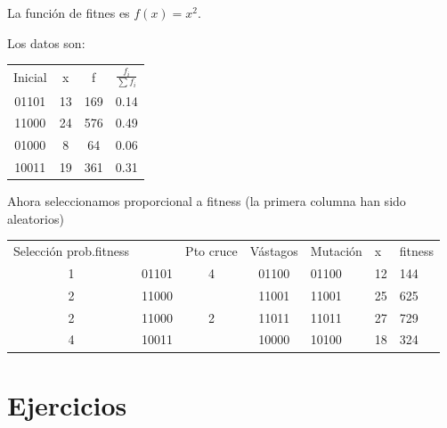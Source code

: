 \documentclass{apuntes}
\begin{document}
\begin{example}

La función de fitnes es $f(x) = x^2$.

Los datos son:

\begin{center}
\begin{tabular}{cccc}
Inicial & x & f & $\frac{f_i}{\sum f_i}$\\
01101&13&169&0.14\\
11000&24&576&0.49\\
01000&8&64&0.06\\
10011&19&361&0.31
\end{tabular}
\end{center}

Ahora seleccionamos proporcional a fitness (la primera columna han sido aleatorios)

\begin{center}
\begin{tabular}{cccc}
Selección prob.fitness && Pto cruce & Vástagos & Mutación & x & fitness\\
1 & 01101 & 4 & 01100 & 01100 & 12 & 144\\
2 & 11000 &   & 11001 & 11001 & 25 & 625\\
2 & 11000 & 2 & 11011 & 11011 & 27 & 729\\
4 & 10011 &   & 10000 & 10100 & 18 & 324
\end{tabular}
\end{center}



\end{example}

\appendix


\chapter{Ejercicios}

\printindex
\end{document}

